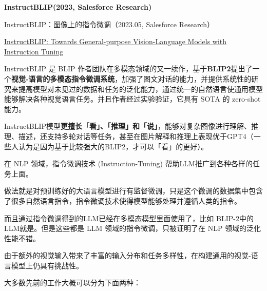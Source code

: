 \documentclass[zihao=false,fontset=windows]{ctexart}
\begin{document}
{\bfseries InstructBLIP(2023, Salesforce Research)\par}
\begin{feishuquote}
InstructBLIP：图像上的指令微调（2023.05, Salesforce Research）\par

\href{https://arxiv.org/abs/2305.06500}{InstructBLIP: Towards General-purpose Vision-Language Models with Instruction Tuning}\par

\end{feishuquote}


InstructBLIP 是 BLIP 作者团队在多模态领域的又一续作，基于\textbf{BLIP2}提出了一个\textcolor{feishuRed}{\textbf{视觉-语言的多模态指令微调系统}}，加强了图文对话的能力，并提供系统性的研究来提高模型对未见过的数据和任务的泛化能力，通过统一的自然语言使通用模型能够解决各种视觉语言任务。并且作者经过实验验证，它具有 SOTA 的 zero-shot 能力。\par

InstructBLIP模型\textbf{更擅长「看」、「推理」和「说」}，能够对复杂图像进行理解、推理、描述，还支持多轮对话等任务，甚至在图片解释和推理上表现优于GPT4（一些人认为是因为基于比较强大的BLIP2，才可以「看」的更好）。\par

\par\vspace{1.15em}\par\vspace{0.28em}
在 NLP 领域，指令微调技术 (Instruction-Tuning) 帮助LLM推广到各种各样的任务上面。\par

\begin{feishuquote}
做法就是对预训练好的大语言模型进行有监督微调，只是这个微调的数据集中包含了很多自然语言指令，指令微调技术使得模型能够处理并遵循人类的指令。\par

\end{feishuquote}
而且通过指令微调得到的LLM已经在多模态模型里面使用了，比如 BLIP-2中的LLM就是。但是这些都是 LLM 领域的指令微调，只被证明了在 NLP 领域的泛化性能不错。\par

由于额外的视觉输入带来了丰富的输入分布和任务多样性，在构建通用的视觉-语言模型上仍具有挑战性。\par

大多数先前的工作大概可以分为下面两种：\par
\end{document}
